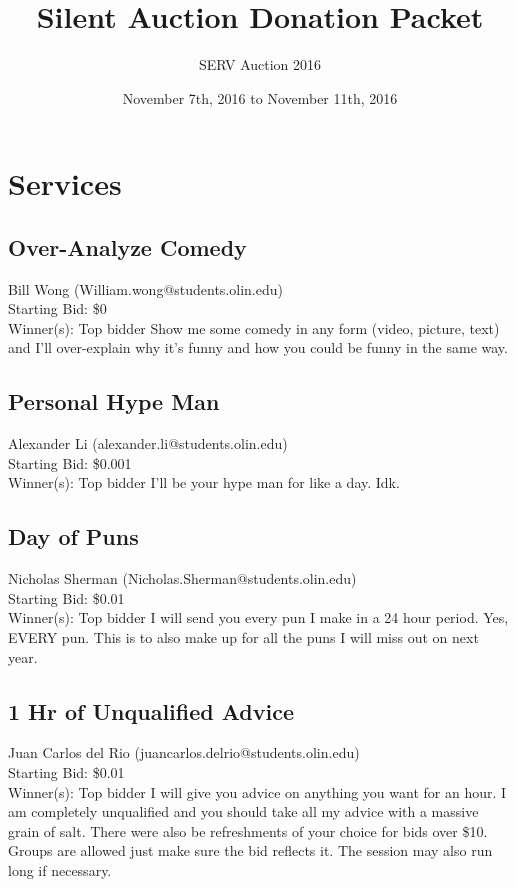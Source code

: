 \documentclass[11pt]{article}
\title{Silent Auction Donation Packet}
\author{SERV Auction 2016}
\date{November 7th, 2016 to November 11th, 2016}
\begin{document}
\maketitle
\section{Services}
\subsection{Over-Analyze Comedy}
Bill Wong (William.wong@students.olin.edu) \\
Starting Bid: \$0 \\
Winner(s): 
Top bidder\newline
Show me some comedy in any form (video, picture, text) and I'll over-explain why it's funny and how you could be funny in the same way.
\subsection{Personal Hype Man}
Alexander Li (alexander.li@students.olin.edu) \\
Starting Bid: \$0.001 \\
Winner(s): 
Top bidder\newline
I'll be your hype man for like a day. Idk.
\subsection{Day of Puns}
Nicholas Sherman (Nicholas.Sherman@students.olin.edu) \\
Starting Bid: \$0.01 \\
Winner(s): 
Top bidder\newline
I will send you every pun I make in a 24 hour period. Yes, EVERY pun. This is to also make up for all the puns I will miss out on next year.
\subsection{1 Hr of Unqualified Advice}
Juan Carlos del Rio (juancarlos.delrio@students.olin.edu) \\
Starting Bid: \$0.01 \\
Winner(s): 
Top bidder\newline
I will give you advice on anything you want for an hour. I am completely unqualified and you should take all my advice with a massive grain of salt. There were also be refreshments of your choice for bids over \$10. Groups are allowed just make sure the bid reflects it. The session may also run long if necessary.
\end{document}
